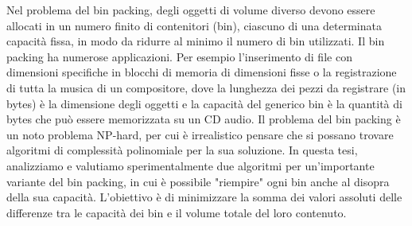 Nel problema del bin packing, degli oggetti di volume diverso devono essere allocati in un numero finito di contenitori 
(bin), ciascuno di una determinata capacità fissa, in modo da ridurre al minimo il numero di bin utilizzati. Il bin packing 
ha numerose applicazioni. Per esempio l'inserimento di file con dimensioni specifiche in blocchi di memoria di dimensioni fisse 
o la registrazione di tutta la musica di un compositore, dove la lunghezza dei pezzi da registrare (in bytes) è la dimensione 
degli oggetti e la capacità del generico bin è la quantità di bytes che può essere memorizzata su un CD audio. Il problema del 
bin packing è un noto problema NP-hard, per cui è irrealistico pensare che si possano trovare algoritmi di complessità polinomiale 
per la sua soluzione. In questa tesi, analizziamo e valutiamo sperimentalmente due algoritmi per un'importante variante del bin 
packing, in cui è possibile "riempire" ogni bin anche al disopra della sua capacità. L'obiettivo è di minimizzare la somma dei 
valori assoluti delle differenze tra le capacità dei bin e il volume totale del loro contenuto.